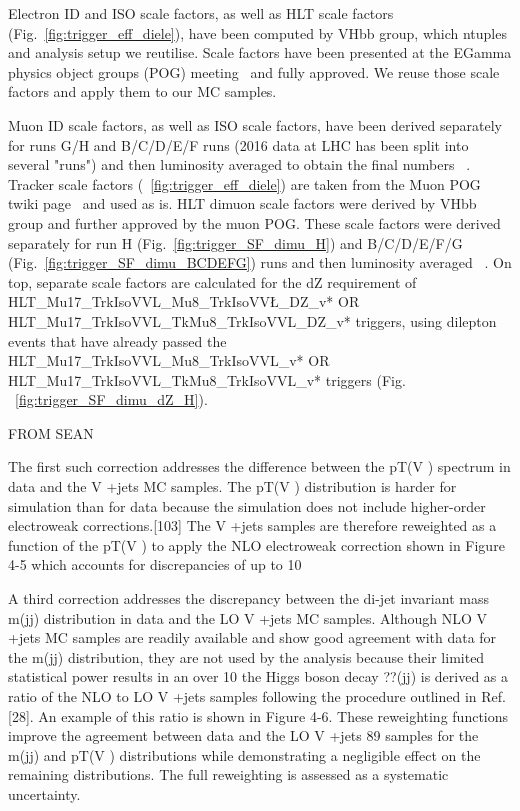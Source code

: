 Electron ID and ISO scale factors, as well as HLT scale factors (Fig.~\ref{fig:trigger_eff_diele}), have been computed by VHbb group, which ntuples and analysis setup we reutilise. Scale factors have been presented at the EGamma physics object groups (POG) meeting~\cite{egSF} and fully approved. We reuse those scale factors and apply them to our MC samples. 

Muon ID scale factors, as well as ISO scale factors, have been derived separately for runs G/H and B/C/D/E/F runs (2016 data at LHC has been split into several "runs") and then luminosity averaged to obtain the final numbers ~\cite{muonIDnISO}. Tracker scale factors (~\ref{fig:trigger_eff_diele}) are taken from the Muon POG twiki page~\cite{muonTRK} and used as is. HLT dimuon scale factors were derived by VHbb group and further approved by the muon POG. These scale factors were derived separately for run H (Fig.~\ref{fig:trigger_SF_dimu_H}) and B/C/D/E/F/G (Fig.~\ref{fig:trigger_SF_dimu_BCDEFG}) runs and then luminosity averaged ~\cite{muonTrigger}. On top, separate scale factors are calculated for the dZ requirement of HLT\_Mu17\_TrkIsoVVL\_Mu8\_TrkIsoVV\L\_DZ\_v* OR HLT\_Mu17\_TrkIsoVVL\_TkMu8\_TrkIsoVVL\_DZ\_v* triggers, using dilepton events that have already passed the HLT\_Mu17\_TrkIsoVVL\_Mu8\_TrkIsoVVL\_v* OR HLT\_Mu17\_TrkIsoVVL\_TkMu8\_TrkIsoVVL\_v* triggers (Fig. ~\ref{fig:trigger_SF_dimu_dZ_H}).





FROM SEAN

The first such correction addresses the difference between the pT(V ) spectrum in data and the V +jets MC samples. The pT(V ) distribution is harder for simulation than for data because the simulation does not include higher-order electroweak corrections.[103] The V +jets samples are therefore reweighted as a function of the pT(V ) to apply the NLO electroweak correction shown in Figure 4-5 which accounts for discrepancies of up to 10%

A third correction addresses the discrepancy between the di-jet invariant mass m(jj)
distribution in data and the LO V +jets MC samples. Although NLO V +jets MC samples are readily available and show good agreement with data for the m(jj) distribution, they are not used by the analysis because their limited statistical power results in an over 10%
the Higgs boson decay ??(jj) is derived as a ratio of the NLO to LO V +jets samples following the procedure outlined in Ref. [28]. An example of this ratio is shown in Figure 4-6. These reweighting functions improve the agreement between data and the LO V +jets
89
samples for the m(jj) and pT(V ) distributions while demonstrating a negligible effect on the remaining distributions. The full reweighting is assessed as a systematic uncertainty.







